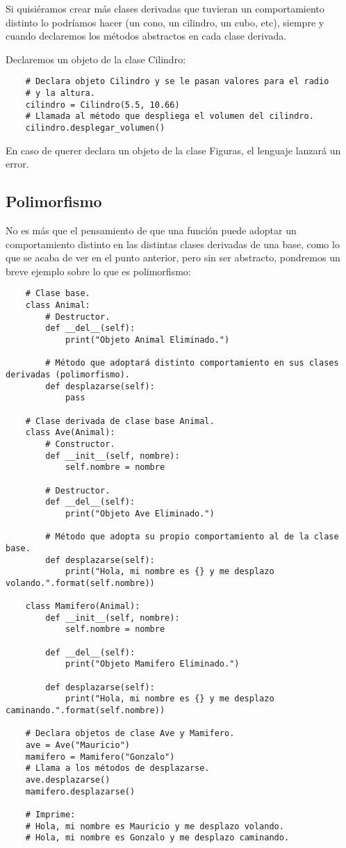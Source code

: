 Si quisiéramos crear más clases derivadas que tuvieran un comportamiento distinto lo podríamos hacer (un cono, un cilindro, un cubo, etc), siempre y cuando declaremos los métodos abstractos en cada clase derivada.

Declaremos un objeto de la clase Cilindro:
\begin{lstlisting}
    # Declara objeto Cilindro y se le pasan valores para el radio
    # y la altura.
    cilindro = Cilindro(5.5, 10.66)
    # Llamada al método que despliega el volumen del cilindro.
    cilindro.desplegar_volumen()
\end{lstlisting}

En caso de querer declara un objeto de la clase Figuras, el lenguaje lanzará un error.


\subsection{Polimorfismo}

No es más que el pensamiento de que una función puede adoptar un comportamiento distinto en las distintas clases derivadas de una base, como lo que se acaba de ver en el punto anterior, pero sin ser abstracto, pondremos un breve ejemplo sobre lo que es polimorfismo:
\begin{lstlisting}
    # Clase base.
    class Animal:
        # Destructor.
        def __del__(self):
            print("Objeto Animal Eliminado.")

        # Método que adoptará distinto comportamiento en sus clases derivadas (polimorfismo).
        def desplazarse(self):
            pass

    # Clase derivada de clase base Animal.
    class Ave(Animal):
        # Constructor.
        def __init__(self, nombre):
            self.nombre = nombre

        # Destructor.
        def __del__(self):
            print("Objeto Ave Eliminado.")

        # Método que adopta su propio comportamiento al de la clase base.
        def desplazarse(self):
            print("Hola, mi nombre es {} y me desplazo volando.".format(self.nombre))

    class Mamifero(Animal):
        def __init__(self, nombre):
            self.nombre = nombre

        def __del__(self):
            print("Objeto Mamifero Eliminado.")

        def desplazarse(self):
            print("Hola, mi nombre es {} y me desplazo caminando.".format(self.nombre))

    # Declara objetos de clase Ave y Mamifero.
    ave = Ave("Mauricio")
    mamifero = Mamifero("Gonzalo")
    # Llama a los métodos de desplazarse.
    ave.desplazarse()
    mamifero.desplazarse()
    
    # Imprime:
    # Hola, mi nombre es Mauricio y me desplazo volando.
    # Hola, mi nombre es Gonzalo y me desplazo caminando.
\end{lstlisting}

